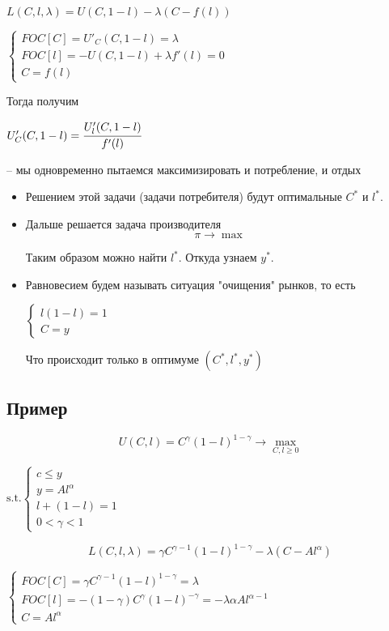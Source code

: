 \documentclass[reqno]{article}
\theoremstyle{definition}
\theoremstyle{definition}
\theoremstyle{definition}
\theoremstyle{definition}
\theoremstyle{definition}
\theoremstyle{definition}
\theoremstyle{definition}
\theoremstyle{definition}
\theoremstyle{definition}
\begin{document}
	$L(C,l,\lambda)=U(C,1-l)-\lambda(C-f(l))$
	
	$
	\begin{cases}
		FOC[C]=U'_C(C,1-l)=\lambda \\
		FOC[l]=-U(C,1-l)+\lambda f'(l) = 0 \\
		C=f(l)
	\end{cases}
	$
	
	Тогда получим 
	
	$U'_C(C,1-l)=\cfrac{U'_l(C,1-l)}{f'(l)}$
	
	-- мы одновременно пытаемся максимизировать и потребление, и отдых 
		
	\begin{itemize}
		\item Решением этой задачи (задачи потребителя) будут оптимальные $C^*$ и $l^*$.
		
		\item Дальше решается задача производителя
		$$\pi \rightarrow \max$$
		
		Таким образом можно найти $l^*$. Откуда узнаем $y^*$.
		
		\item Равновесием будем называть ситуация "очищения" рынков, то есть
		
		$
		\begin{cases}
			l(1-l)=1\\
			C=y
		\end{cases}
		$ 
		
		Что происходит только в оптимуме $(C^*, l^*, y^*)$
	\end{itemize}
	 	
	\subsection{Пример}
	
	$$U(C,l) = C^\gamma (1-l)^{1-\gamma} \rightarrow \max\limits_{C,l \geq 0}$$
	
	$
	\text{s.t.} 
	\begin{cases}
		c \leq y \\
		y=Al^\alpha \\
		l+(1-l)=1 \\
		0<\gamma<1
	\end{cases}
	$
	
	$$L(C,l,\lambda) = \gamma C^{\gamma - 1} (1-l)^{1-\gamma} - \lambda(C-Al^\alpha)$$
	
	$
	\begin{cases}
		FOC[C]=\gamma C^{\gamma - 1}(1 - l)^{1-\gamma} = \lambda \\
		FOC[l]=-(1-\gamma)C^\gamma (1-l)^{-\gamma} = -\lambda \alpha Al^{\alpha -1} \\
		C = Al^\alpha
	\end{cases}
	$
	
\end{document}
